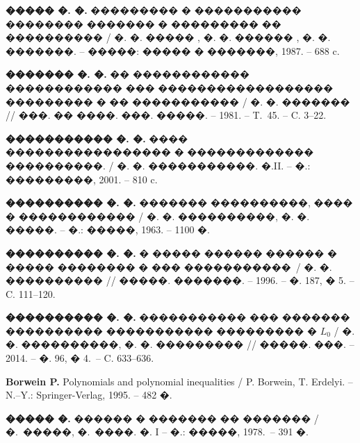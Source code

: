 \documentclass[11pt, twoside]{article}
\begin{document}
{\footnotesize
\begin{thebibliography}{99}

\textbf{ ����� �. �.}
��������� � ����������� ��������
������� � ��������� �� ���������� / �. �. ����� , �. �. ������ , �. �. �������. --  �����:  ����� � �������, 1987. -- 688 c.

\textbf{ ������� �. �.} 
�� ������������ ������������ ��� ������������������ ��������� � �� ����������� / �. �. �������
// ���. �� ����. ���. �����. -- 1981. -- T.~45. -- C.  3--22.

\textbf{  ����������� �. �. }
���� ����������������� � ������������� ����������. / �. �. �����������. �.II. -- �.: ���������, 2001. -- 810 c.

\textbf{����������  �. �.}
������� ����������, ���� � ������������ / �. �. ����������, �. �. �����. -- �.: �����, 1963. --  1100 �.

\textbf{ ���������� �. �.} 
� ����� ������
������ � ����� �������� � ��� �����������~/ �. �. ����������
// �����. �������. -- 1996. -- �. 187, � 5. -- C. 111--120.

\textbf{ ���������� �. �.}
����������� ���
������� ���������� ����������� ��������� � $L_0$ / �. �. ����������,
�. �. ��������� // �����. ���. -- 2014. -- �. 96, � 4.~-- C. 633--636.

\textbf{  Borwein P.}
Polynomials and polynomial inequalities / P. Borwein, T. Erdelyi. --
 N.--Y.: Springer-Verlag, 1995. -- 482 �.

\textbf{  ����� �. }
������ � ������� �� ������� / �.~�����, �.~����. �. I -- �.: �����,
 1978.~-- 391 �.

\end{thebibliography}
}

\AuxAbstract

\renewcommand{\refname}{\indent\normalsize\textsc{References}}
\end{document}
